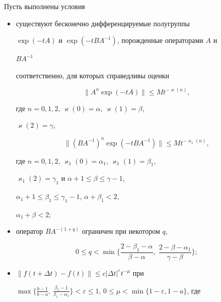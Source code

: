 \begin{thm} 


Пусть выполнены условия 


\begin{itemize} 


\item[$1^\circ$.] существуют бесконечно дифференцируемые полугруппы 


$\exp(-t A)$ и $\exp(-t B A^{-1})$, порожденные операторами $A$ и 


$BA^{-1}$ 


соответственно, для которых справедливы оценки 


\begin{equation} 


\|A^n\exp(-t A)\|\le M t^{-\varkappa(n)}, 


\end{equation} 


где $n=0,1,2$, $\varkappa(0)=\alpha$, $\varkappa(1)=\beta$, 


$\varkappa(2)=\gamma$, 


\begin{equation} 


\|(B A^{-1})^n\exp(-t B A^{-1})\|\le M t^{-\varkappa_1(n)}, 


\end{equation} 


где $n=0,1,2$, $\varkappa_1(0)=\alpha_1$, $\varkappa_1(1)=\beta_1$, 


$\varkappa_1(2)=\gamma_1$ и $\alpha+1\le\beta\le\gamma-1$, 


$\alpha_1+1\le\beta_1\le\gamma_1-1$, $\alpha+\beta_1<2$, 


$\alpha_1+\beta<2;$ 


\item[$2^\circ$.] оператор $B A^{-(1+q)}$ ограничен при некотором $q$, 


$$ 


0\le q<\min\bigg\{\frac{2-\beta_1-\alpha}{\beta-\alpha},\; 


\frac{2-\beta-\alpha_1}{\gamma-\beta}\bigg\};


$$ 


\item[$3^\circ$.] $\|f(t+\Delta t)-f(t)\|\le c|\Delta t|^\varepsilon 


t^{-\mu}$ при 


$\max\big\{\frac{b-1}{b-a},\,\frac{\beta_1-1}{\beta_1-\alpha_1}\big\} 


<\varepsilon\le1$, $0\le\mu<\min\{1-\varepsilon,1-a\}$, где 



\end{itemize}
\end{thm}
